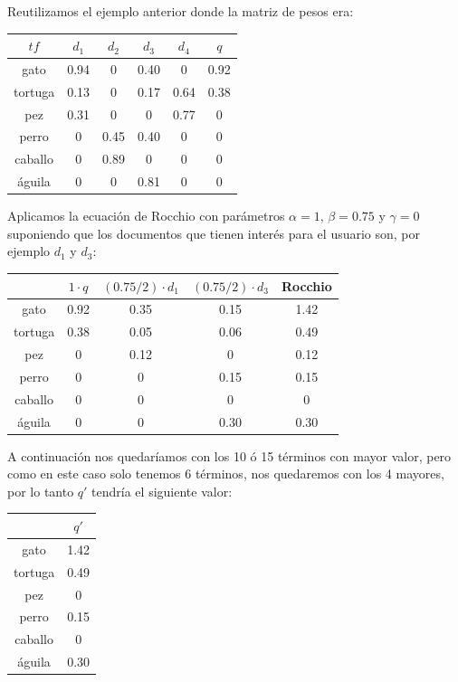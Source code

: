\documentclass[size=a4, parskip=half, titlepage=false, toc=flat, toc=bib, 12pt]{scrartcl}
\theoremstyle{theorem-style}
\theoremstyle{definition-style}
\theoremstyle{remark-style}
\theoremstyle{example-style}
\theoremstyle{definition-style}
\theoremstyle{remark-style}
\begin{document}
Reutilizamos el ejemplo anterior donde la matriz de pesos era:
\begin{table}[H]
\centering
\begin{tabular}{|c|c|c|c|c|c|}
\hline
$tf$    & $d_1$ & $d_2$ & $d_3$ & $d_4$ & $q$  \\ \hline
gato    & 0.94  & 0     & 0.40  & 0     & 0.92 \\ \hline
tortuga & 0.13  & 0     & 0.17  & 0.64  & 0.38 \\ \hline
pez     & 0.31  & 0     & 0     & 0.77  & 0    \\ \hline
perro   & 0     & 0.45  & 0.40  & 0     & 0    \\ \hline
caballo & 0     & 0.89  & 0     & 0     & 0    \\ \hline
águila  & 0     & 0     & 0.81  & 0     & 0    \\ \hline
\end{tabular}
\end{table}
Aplicamos la ecuación de Rocchio con parámetros $\alpha = 1$, $\beta = 0.75$ y $\gamma = 0$ suponiendo que los documentos que tienen interés para el usuario son, por ejemplo $d_1$ y $d_3$:
\begin{table}[H]
\centering
\begin{tabular}{|c|c|c|c|c|}
\hline
 & $1 \cdot q$ & $(0.75/2) \cdot d_1$ & $(0.75/2) \cdot d_3$ & Rocchio \\ \hline
gato    & 0.92        & 0.35                 & 0.15                 & 1.42 \\ \hline
tortuga & 0.38        & 0.05                 & 0.06                 & 0.49 \\ \hline
pez     & 0           & 0.12                 & 0                    & 0.12 \\ \hline
perro   & 0           & 0                    & 0.15                 & 0.15 \\ \hline
caballo & 0           & 0                    & 0                    & 0    \\ \hline
águila  & 0           & 0                    & 0.30                 & 0.30 \\ \hline
\end{tabular}
\end{table}
A continuación nos quedaríamos con los 10 ó 15 términos con mayor valor, pero como en este caso solo tenemos 6 términos, nos quedaremos con los 4 mayores, por lo tanto $q'$ tendría el siguiente valor:
\begin{table}[H]
\centering
\begin{tabular}{|c|c|}
\hline
        & $q'$  \\ \hline
gato    & 1.42 \\ \hline
tortuga & 0.49 \\ \hline
pez     & 0    \\ \hline
perro   & 0.15 \\ \hline
caballo & 0    \\ \hline
águila  & 0.30 \\ \hline
\end{tabular}
\end{table}
\end{document}
